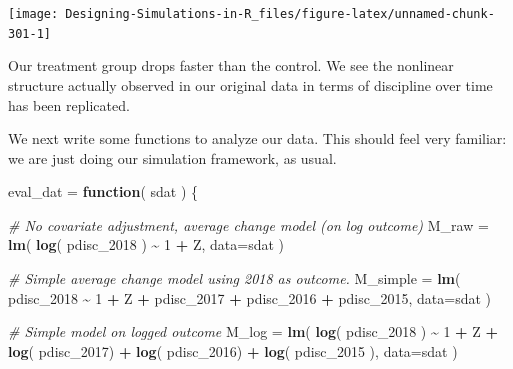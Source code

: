\documentclass[
]{book}
\newenvironment{Shaded}{\begin{snugshade}}{\end{snugshade}}
\newcommand{\AttributeTok}[1]{\textcolor[rgb]{0.13,0.29,0.53}{#1}}
\newcommand{\CommentTok}[1]{\textcolor[rgb]{0.56,0.35,0.01}{\textit{#1}}}
\newcommand{\ControlFlowTok}[1]{\textcolor[rgb]{0.13,0.29,0.53}{\textbf{#1}}}
\newcommand{\DecValTok}[1]{\textcolor[rgb]{0.00,0.00,0.81}{#1}}
\newcommand{\FunctionTok}[1]{\textcolor[rgb]{0.13,0.29,0.53}{\textbf{#1}}}
\newcommand{\NormalTok}[1]{#1}
\newcommand{\OtherTok}[1]{\textcolor[rgb]{0.56,0.35,0.01}{#1}}
\newcommand{\SpecialCharTok}[1]{\textcolor[rgb]{0.81,0.36,0.00}{\textbf{#1}}}
\begin{document}
\begin{center}\texttt{[image: Designing-Simulations-in-R\_files/figure-latex/unnamed-chunk-301-1]} \end{center}

Our treatment group drops faster than the control. We see the nonlinear structure actually observed in our original data in terms of discipline over time has been replicated.

We next write some functions to analyze our data.
This should feel very familiar: we are just doing our simulation framework, as usual.

\begin{Shaded}
\begin{Highlighting}[]
\NormalTok{eval\_dat }\OtherTok{=} \ControlFlowTok{function}\NormalTok{( sdat ) \{}
    
    \CommentTok{\# No covariate adjustment, average change model (on log outcome)}
\NormalTok{    M\_raw }\OtherTok{=} \FunctionTok{lm}\NormalTok{( }\FunctionTok{log}\NormalTok{( pdisc\_2018 ) }\SpecialCharTok{\textasciitilde{}} \DecValTok{1} \SpecialCharTok{+}\NormalTok{ Z, }\AttributeTok{data=}\NormalTok{sdat )}

    \CommentTok{\# Simple average change model using 2018 as outcome.}
\NormalTok{    M\_simple }\OtherTok{=} \FunctionTok{lm}\NormalTok{( pdisc\_2018 }\SpecialCharTok{\textasciitilde{}} \DecValTok{1} \SpecialCharTok{+}\NormalTok{ Z }\SpecialCharTok{+}\NormalTok{ pdisc\_2017 }\SpecialCharTok{+}\NormalTok{ pdisc\_2016 }\SpecialCharTok{+}\NormalTok{ pdisc\_2015,}
                   \AttributeTok{data=}\NormalTok{sdat )}

    \CommentTok{\# Simple model on logged outcome}
\NormalTok{    M\_log }\OtherTok{=} \FunctionTok{lm}\NormalTok{( }\FunctionTok{log}\NormalTok{( pdisc\_2018 ) }\SpecialCharTok{\textasciitilde{}} \DecValTok{1} \SpecialCharTok{+}\NormalTok{ Z }\SpecialCharTok{+} \FunctionTok{log}\NormalTok{( pdisc\_2017) }\SpecialCharTok{+} 
                  \FunctionTok{log}\NormalTok{( pdisc\_2016) }\SpecialCharTok{+} \FunctionTok{log}\NormalTok{( pdisc\_2015 ),}
                \AttributeTok{data=}\NormalTok{sdat )}
    

\end{Highlighting}
\end{Shaded}
\end{document}
